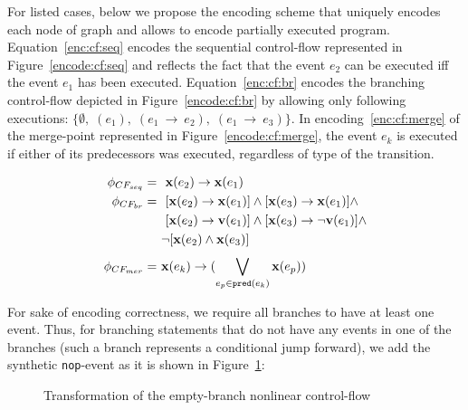 For listed cases, below we propose the encoding scheme that uniquely encodes each node of graph and allows to encode partially executed program.
Equation~\ref{enc:cf:seq} encodes the sequential control-flow represented in Figure~\ref{encode:cf:seq} and reflects the fact that the event $e_2$ can be executed iff the event $e_1$ has been executed.
Equation~\ref{enc:cf:br} encodes the branching control-flow depicted in Figure~\ref{encode:cf:br} by allowing only following executions: $\{\emptyset, \; (e_1), \; (e_1~\rightarrow~e_2), \; (e_1 ~\rightarrow~e_3)\}$. In encoding~\ref{enc:cf:merge} of the merge-point represented in Figure~\ref{encode:cf:merge}, the event $e_k$ is executed if either of its predecessors was executed, regardless of type of the transition.

\begin{align}
\phi_{CF_{seq}}   = \ & \ \mathbf{x}(e_2) \rightarrow \mathbf{x}(e_1) \label{enc:cf:seq} \\
\phi_{CF_{br}}    = \ & \ [\mathbf{x}(e_2) \rightarrow \mathbf{x}(e_1)] \land [\mathbf{x}(e_3) \rightarrow \mathbf{x}(e_1)] \land \nonumber \\
                      & \ [\mathbf{x}(e_2) \rightarrow \mathbf{v}(e_1)] \land [\mathbf{x}(e_3) \rightarrow \lnot\mathbf{v}(e_1)] \land \nonumber \\
                      & \lnot [\mathbf{x}(e_2) \land \mathbf{x}(e_3)]  \label{enc:cf:br} \\
\phi_{CF_{mer}} = \ & \mathbf{x}(e_k) \rightarrow (\bigvee\limits_{e_p \in \mathtt{pred}(e_k)}^{} \mathbf{x}(e_p)) \label{enc:cf:merge}
\end{align}


For sake of encoding correctness, we require all branches to have at least one event.
Thus, for branching statements that do not have any events in one of the branches (such a branch represents a conditional jump forward), we add the synthetic \texttt{nop}-event as it is shown in Figure~\ref{encode:branching:nop}:

\begin{figure}
    \centering
    \caption{Transformation of the empty-branch nonlinear control-flow}
    \label{encode:branching:nop}
\end{figure}


